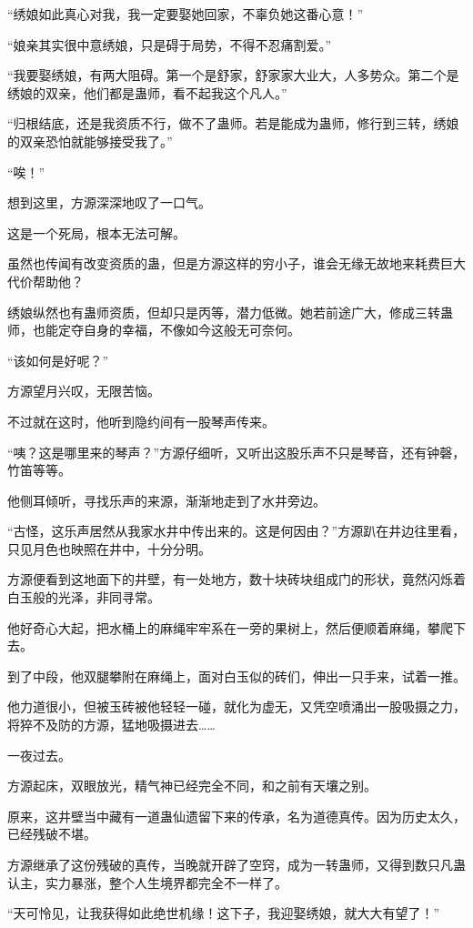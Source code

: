 \begin{this_body}
“绣娘如此真心对我，我一定要娶她回家，不辜负她这番心意！”

“娘亲其实很中意绣娘，只是碍于局势，不得不忍痛割爱。”

“我要娶绣娘，有两大阻碍。第一个是舒家，舒家家大业大，人多势众。第二个是绣娘的双亲，他们都是蛊师，看不起我这个凡人。”

“归根结底，还是我资质不行，做不了蛊师。若是能成为蛊师，修行到三转，绣娘的双亲恐怕就能够接受我了。”

“唉！”

想到这里，方源深深地叹了一口气。

这是一个死局，根本无法可解。

虽然也传闻有改变资质的蛊，但是方源这样的穷小子，谁会无缘无故地来耗费巨大代价帮助他？

绣娘纵然也有蛊师资质，但却只是丙等，潜力低微。她若前途广大，修成三转蛊师，也能定夺自身的幸福，不像如今这般无可奈何。

“该如何是好呢？”

方源望月兴叹，无限苦恼。

不过就在这时，他听到隐约间有一股琴声传来。

“咦？这是哪里来的琴声？”方源仔细听，又听出这股乐声不只是琴音，还有钟磬，竹笛等等。

他侧耳倾听，寻找乐声的来源，渐渐地走到了水井旁边。

“古怪，这乐声居然从我家水井中传出来的。这是何因由？”方源趴在井边往里看，只见月色也映照在井中，十分分明。

方源便看到这地面下的井壁，有一处地方，数十块砖块组成门的形状，竟然闪烁着白玉般的光泽，非同寻常。

他好奇心大起，把水桶上的麻绳牢牢系在一旁的果树上，然后便顺着麻绳，攀爬下去。

到了中段，他双腿攀附在麻绳上，面对白玉似的砖们，伸出一只手来，试着一推。

他力道很小，但被玉砖被他轻轻一碰，就化为虚无，又凭空喷涌出一股吸摄之力，将猝不及防的方源，猛地吸摄进去……

一夜过去。

方源起床，双眼放光，精气神已经完全不同，和之前有天壤之别。

原来，这井壁当中藏有一道蛊仙遗留下来的传承，名为道德真传。因为历史太久，已经残破不堪。

方源继承了这份残破的真传，当晚就开辟了空窍，成为一转蛊师，又得到数只凡蛊认主，实力暴涨，整个人生境界都完全不一样了。

“天可怜见，让我获得如此绝世机缘！这下子，我迎娶绣娘，就大大有望了！”


\end{this_body}
